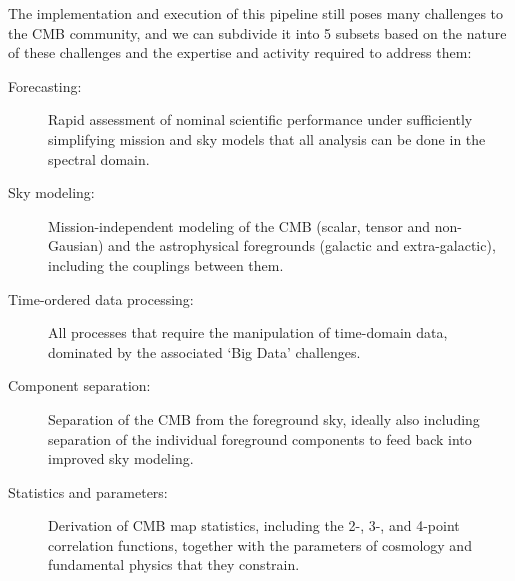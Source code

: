 The implementation and execution of this pipeline still poses many challenges to the CMB community, and we can subdivide it into 5 subsets based on the nature of these challenges and the expertise and activity required to address them:
\vspace*{-0.1in}
\begin{description}
\item[Forecasting:] Rapid assessment of nominal scientific performance under sufficiently simplifying mission and sky models that all analysis can be done in the spectral domain.
\item[Sky modeling:] Mission-independent modeling of the CMB (scalar, tensor and non-Gausian) and the astrophysical foregrounds (galactic and extra-galactic), including the couplings between them.
\item[Time-ordered data processing:] All processes that require the manipulation of time-domain data, dominated by the associated `Big Data' challenges.
\item[Component separation:] Separation of the CMB from the foreground sky, ideally also including separation of the individual foreground components to feed back into improved sky modeling.
\item[Statistics and parameters:] Derivation of CMB map statistics, including the 2-, 3-, and 4-point correlation functions, together with the parameters of cosmology and fundamental physics that they constrain.
\end{description}

\newpage



\newpage



\newpage



\newpage



\newpage



\newpage

%



